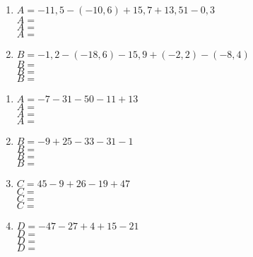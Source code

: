 \documentclass[11pt]{article}
\begin{document}
\begin{exercicedevoir}
\begin{multicols}{2}
\begin{enumerate}[itemsep=1em,label={}]
\item  $ A =  -11{,}5-(-10{,}6)+15{,}7+13{,}51-0{,}3$\\$ A =$ \\$ A =$\\$ A =$
\item  $ B =  -1{,}2-(-18{,}6)-15{,}9+(-2{,}2)-(-8{,}4)$\\$ B =$ \\$ B =$\\$ B =$
\end{enumerate}
\end{multicols}
\end{exercicedevoir}

\begin{exercicedevoir}
\begin{multicols}{2}
\begin{enumerate}[itemsep=1em,label={}]
\item  $ A = -7-31-50-11+13$\\$ A =$ \\$ A =$\\$ A =$
\item  $ B = -9+25-33-31-1$\\$ B =$ \\$ B =$\\$ B =$
\item  $ C = 45-9+26-19+47$\\$ C =$ \\$ C =$\\$ C =$
\item  $ D = -47-27+4+15-21$\\$ D =$ \\$ D =$\\$ D =$
\end{enumerate}
\end{multicols}
\end{exercicedevoir}
\end{document}
